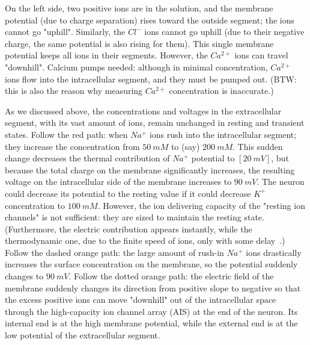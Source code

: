 On the left side, two positive ions are in the solution, and the membrane potential (due to charge separation) rises toward the outside segment; the ions cannot go "uphill". Similarly, 
the $Cl^-$ ions cannot go uphill (due to their negative charge, the same potential is also rising for them). This single membrane potential keeps all ions in their segments. However, the $Ca^{2+}$ ions can travel "downhill".
Calcium pumps needed: although in minimal concentration, $Ca^{2+}$ ions flow into 
the intracellular segment, and they must be pumped out. (BTW: this is also the reason why measuring $Ca^{2+}$ concentration is inaccurate.)

As we discussed above, 
the concentrations and voltages in the extracellular segment, with its vast amount of ions, remain unchanged
in resting and transient states.
Follow the red path: when $Na^+$ ions rush into the intracellular segment;
they increase the concentration from $50\ mM$ to (say) $200\ mM$. This sudden change decreases the thermal contribution of $Na^+$ potential to $[20\ mV]$, but 
because the total charge on the membrane significantly increases, the resulting voltage on the intracellular  side of the membrane increases to $90\ mV$.
The neuron could decrease its potential to the resting value if it could decrease $K^+$ concentration to $100\ mM$. However, the ion delivering capacity of the "resting ion channels" is not sufficient: they are sized to maintain the resting state.
(Furthermore, the electric contribution appears instantly, while the thermodynamic one, due to the finite speed of ions, only with some delay~\cite{VeghNon-ordinaryLaws:2025}.)
Follow the dashed orange path: the large amount of rush-in $Na^+$ ions drastically increases the surface concentration on the membrane, so the potential suddenly changes to $90\ mV$. Follow the dotted orange path: the electric field of the membrane suddenly changes its direction from positive slope to negative so that the excess positive ions can move "downhill" out of the intracellular space through the high-capacity ion channel array 
(AIS) at the end of the neuron.
Its internal end is at the high membrane potential,
while the external end is at the low potential of the extracellular segment. 

